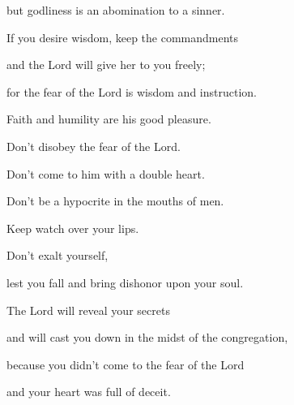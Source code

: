 {\par }{\QB but godliness is an abomination to a sinner.
\par }{\Q {}If you desire wisdom, keep the commandments
\par }{\QB and the Lord will give her to you freely;
\par }{\Q {}for the fear of the Lord is wisdom and instruction.
\par }{\QB Faith and humility are his good pleasure.
\par }{\Q {}Don’t disobey the fear of the Lord.
\par }{\QB Don’t come to him with a double heart.
\par }{\Q {}Don’t be a hypocrite in the mouths of men.
\par }{\QB Keep watch over your lips.
\par }{\Q {}Don’t exalt yourself,
\par }{\QB lest you fall and bring dishonor upon your soul.
\par }{\Q The Lord will reveal your secrets
\par }{\QB and will cast you down in the midst of the congregation,
\par }{\QB because you didn’t come to the fear of the Lord
\par }{\QB and your heart was full of deceit.
\par }{\BB \par }
